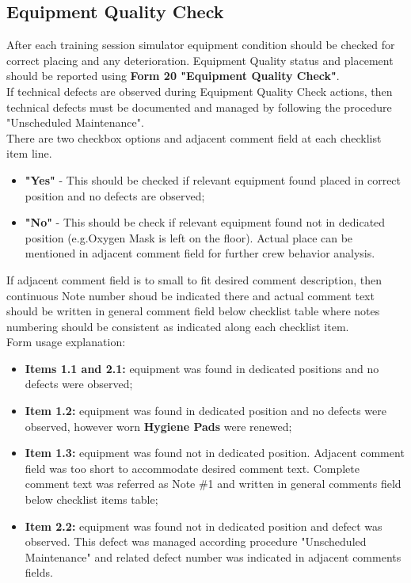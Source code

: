     \subsection{Equipment Quality Check}
        After each training session simulator equipment condition should be checked for correct placing and any deterioration. Equipment Quality status and placement should be 
        reported using \textbf{Form 20 "Equipment Quality Check"}. \\ 
        \vspace{3mm}
        If technical defects are observed during Equipment Quality Check actions, then technical defects must be documented and managed by following the procedure "Unscheduled 
        Maintenance". \\ 
        \vspace{3mm}
        There are two checkbox options and adjacent comment field at each checklist item line.
        \begin{itemize}
            \item \textbf{"Yes"} - This should be checked if relevant equipment found placed in correct position and no defects are observed;
            \item \textbf{"No"} - This should be check if relevant equipment found not in dedicated position (e.g.Oxygen Mask is left on the floor). Actual place can be mentioned 
            in adjacent comment field for further crew behavior analysis.
        \end{itemize}
        If adjacent comment field is to small to fit desired comment description, then continuous Note number shoud be indicated there and actual comment text should be written 
        in general comment field below checklist table where notes numbering should be consistent as indicated along each checklist item. \\
        \vspace{3mm}
        Form usage explanation: 
        \begin{itemize}
            \item \textbf{Items 1.1 and 2.1:} equipment was found in dedicated positions and no defects were observed;
            \item \textbf{Item 1.2:} equipment was found in dedicated position and no defects were observed, however worn \textbf{Hygiene Pads} were renewed;
            \item \textbf{Item 1.3:} equipment was found not in dedicated position. Adjacent comment field was too short to accommodate desired comment text. Complete comment text 
            was referred as Note \#1 and written in general comments field below checklist items table;
            \item \textbf{Item 2.2:} equipment was found not in dedicated position and defect was observed. This defect was managed according procedure "Unscheduled Maintenance" and 
            related defect number was indicated in adjacent comments fields.
        \end{itemize}